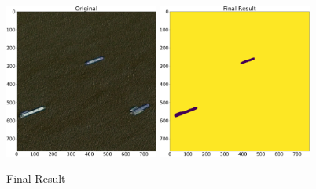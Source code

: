 \begin{figure}[H]
	\centering
	\includegraphics[width=0.45\textwidth]{Pictures/011Original.png}
	\includegraphics[width=0.45\textwidth]{Pictures/011FinalResult.png}
	\caption{Final Result}
	\label{final_result_pic}
\end{figure}


